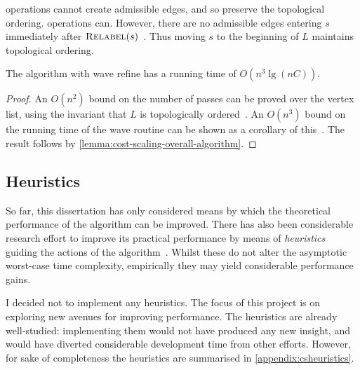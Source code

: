  operations cannot create admissible edges, and so preserve the topological ordering.  operations can. However, there are no admissible edges entering $s$ immediately after $\textproc{Relabel}(s)$~\cite[lemma~6.5]{Goldberg:1987}. Thus moving $s$ to the beginning of $L$ maintains topological ordering.\\

\begin{thm} \label{thm:cost-scaling-wave-complexity}
The algorithm with wave refine has a running time of $O(n^3 \lg (nC))$.
\end{thm}
\begin{proof}
An $O(n^2)$ bound on the number of passes can be proved over the vertex list, using the invariant that $L$ is topologically ordered~\cite[lemma~7.3]{Goldberg:1987}. An $O(n^3)$ bound on the running time of the wave  routine can be shown as a corollary of this~\cite[theorem~7.4]{Goldberg:1987}. The result follows by \cref{lemma:cost-scaling-overall-algorithm}.
\end{proof}


\subsection{Heuristics}

So far, this dissertation has only considered means by which the theoretical performance of the algorithm can be improved. There has also been considerable research effort to improve its practical performance by means of \emph{heuristics} guiding the actions of the algorithm~\cite{Goldberg:1997}. Whilst these do not alter the asymptotic worst-case time complexity, empirically they may yield considerable performance gains.

I decided not to implement any heuristics. The focus of this project is on exploring new avenues for improving performance. The heuristics are already well-studied: implementing them would not have produced any new insight, and would have diverted considerable development time from other efforts. However, for sake of completeness the heuristics are summarised in \cref{appendix:csheuristics}.

